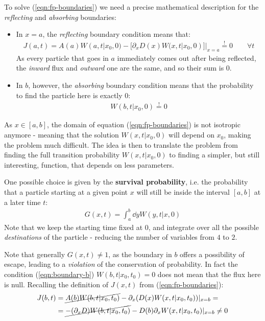 \documentclass[../template.tex]{subfiles}
\begin{document}
To solve (\ref{eqn:fp-boundaries}) we need a precise mathematical description for the \textit{reflecting} and \textit{absorbing} boundaries:  

\begin{itemize}
    \item In $x=a$, the \textit{reflecting} boundary condition means that:
    \begin{align}
        J(a,t) = A(a)W(a,t|x_0,0) - [\partial_x D(x) W(x,t|x_0,0)]|_{x=a} \overset{!}{=}  0 \qquad \forall t
        \label{eqn:boundary-a}
    \end{align}  
    As every particle that goes in $a$ immediately comes out after being reflected, the \textit{inward} flux and \textit{outward} one are the same, and so their sum is $0$.
    \item In $b$, however, the \textit{absorbing} boundary condition means that the probability to find the particle here is exactly $0$:
    \begin{align}
        W(b,t|x_0,0) \overset{!}{=}  0 \label{eqn:boundary-b}
    \end{align}   
\end{itemize}

As $x\in [a,b]$, the domain of equation (\ref{eqn:fp-boundaries}) is not isotropic anymore - meaning that the solution $W(x,t|x_0,0)$ will depend on $x_0$, making the problem much difficult. The idea is then to translate the problem from finding the full transition probability $W(x,t|x_0,0)$ to finding a simpler, but still interesting, function, that depends on less parameters.

One possible choice is given by the \textbf{survival probability}, i.e. the probability that a particle starting at a given point $x$ will still be inside the interval $[a,b]$ at a later time $t$:
\begin{align*}
    G(x,t) = \int_a^b \dd{y} W(y,t|x,0)
\end{align*}
Note that we keep the starting time fixed at $0$, and integrate over all the possible \textit{destinations} of the particle - reducing the number of variables from $4$ to $2$.

Note that generally $G(x, t) \neq 1$, as the boundary in $b$ offers a possibility of escape, leading to a \textit{violation} of the conservation of probability. In fact the condition (\ref{eqn:boundary-b}) $W(b,t|x_0,t_0) = 0$ does not mean that the flux here is null. Recalling the definition of $J(x,t)$ from (\ref{eqn:fp-boundaries}):
\begin{align*}
    J(b,t) &= \cancel{A(b) W(b,t|x_0,t_0)} - \partial_x(D(x) W(x,t|x_0,t_0)) |_{x = b}= \\
    &= \cancel{-(\partial_x D) W(b,t|x_0,t_0) }- D(b) \partial_x W(x,t|x_0,t_0)|_{x = b} \neq 0
\end{align*}    
\end{document}
